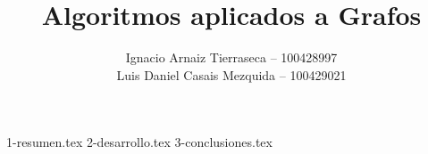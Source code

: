 \documentclass[es]{uc3mreport}
\author{
  Ignacio Arnaiz Tierraseca -- 100428997\\
  Luis Daniel Casais Mezquida -- 100429021
}
\title{Algoritmos aplicados a Grafos}
\begin{document}
  \makecover[old]

  \tableofcontents
  \listoffigures

  \begin{report}
    {1-resumen.tex}
    {2-desarrollo.tex}
    {3-conclusiones.tex}
  \end{report}

  \makebibliography

  \begin{appendices}
  \end{appendices}
\end{document}
